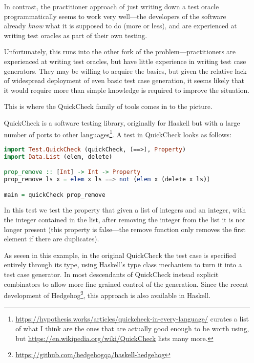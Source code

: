 In contrast,
the practitioner approach of just writing down a test oracle programmatically seems to work very well---the
developers of the software already \emph{know} what it is supposed to do (more or less),
and are experienced at writing test oracles as part of their own testing.

Unfortunately,
this runs into the other fork of the problem---practitioners
are experienced at writing test oracles,
but have little experience in writing test case generators.
They may be willing to acquire the basics,
but given the relative lack of widespread deployment of even basic test case generation,
it seems likely that it would require more than simple knowledge is required to improve the situation.

This is where the QuickCheck\cite{DBLP:conf/icfp/ClaessenH00} family of tools comes in to the picture.

QuickCheck is a software testing library,
originally for Haskell but with a large number of ports to other languages\footnote{
\url{https://hypothesis.works/articles/quickcheck-in-every-language/} curates a list of what I think are the ones that are actually good enough to be worth using,
but \url{https://en.wikipedia.org/wiki/QuickCheck} lists many more.
}.
A test in QuickCheck looks as follows:

\begin{lstlisting}[language=Haskell]
import Test.QuickCheck (quickCheck, (==>), Property)
import Data.List (elem, delete)

prop_remove :: [Int] -> Int -> Property
prop_remove ls x = elem x ls ==> not (elem x (delete x ls))

main = quickCheck prop_remove
\end{lstlisting}

In this test we test the property that given a list of integers and an integer,
with the integer contained in the list,
after removing the integer from the list it is not longer present (this property is false---the
remove function only removes the first element if there are duplicates).

As seeen in this example,
in the original QuickCheck the test case is specified entirely through its type,
using Haskell's type class mechanism to turn it into a test case generator.
In most descendants of QuickCheck instead explicit combinators to allow more fine grained control of the generation.
Since the recent development of Hedgehog\footnote{\url{https://github.com/hedgehogqa/haskell-hedgehog}},
this approach is also available in Haskell.

